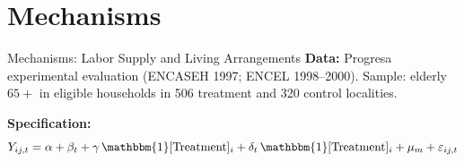 \documentclass[aspectratio=169,usenames,dvipsnames]{beamer}
\begin{document}
\section{Mechanisms}

\begin{frame}[shrink=15]{Mechanisms: Labor Supply and Living Arrangements}\label{mechanisms_lab}
\vspace{0.2cm}
\small
\textbf{Data:} Progresa experimental evaluation (ENCASEH 1997; ENCEL 1998--2000). Sample: elderly $65+$ in eligible households in 506 treatment and 320 control localities.

\vspace{4pt}

\textbf{Specification:}
\vspace{-4pt}
\begin{equation*}
Y_{ij,t} = \alpha + \beta_t + \gamma\,\mathbbm{1}[\text{Treatment}]_i + \delta_t\,\mathbbm{1}[\text{Treatment}]_i + \mu_m + \varepsilon_{ij,t}
\end{equation*}
\begin{center}
\begin{table}
  \centering
  \scriptsize
  \begin{threeparttable}
    
  \end{threeparttable}
\end{table}
\end{center}

\end{frame}

\end{document}
